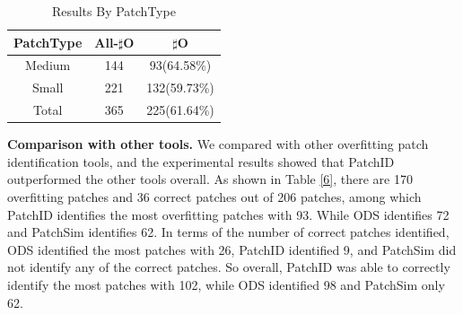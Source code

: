 \begin{table}[ht]
		\begin{minipage}{175px}
			\caption{Results By PatchType}\label{tab5}%
			\begin{tabular}{ccc}
				\toprule
				PatchType & All-$\sharp$O & $\sharp$O\\
				\midrule
				Medium    &144 &93(64.58\%) \\
				Small    &221 &132(59.73\%) \\
				Total   &365 &225(61.64\%) \\
				\bottomrule
			\end{tabular}
		\end{minipage}
\end{table}

\textbf{Comparison with other tools.} We compared with other overfitting patch identification tools, and the experimental results showed that PatchID outperformed the other tools overall. As shown in Table \ref{6}, there are 170 overfitting patches and 36 correct patches out of 206 patches, among which PatchID identifies the most overfitting patches with 93. While ODS identifies 72 and PatchSim identifies 62. In terms of the number of correct patches identified, ODS identified the most patches with 26, PatchID identified 9, and PatchSim did not identify any of the correct patches. So overall, PatchID was able to correctly identify the most patches with 102, while ODS identified 98 and PatchSim only 62.

